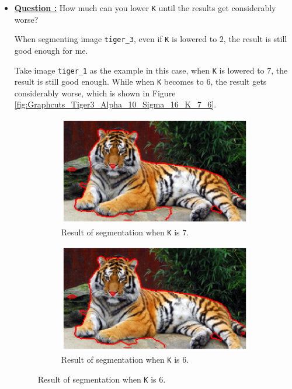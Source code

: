 \documentclass[11pt,a4paper]{article}
\begin{document}
\begin{itemize}
	\item\addtocounter{Counter}{1}\underline{\textbf{Question :}} How much can you lower \texttt{K} until the results get considerably worse?
		\par When segmenting image \texttt{tiger\_3}, even if \texttt{K} is lowered to $2$, the result is still good enough for me.
		\par Take image \texttt{tiger\_1} as the example in this case, when \texttt{K} is lowered to $7$, the result is still good enough. While when \texttt{K} becomes to $6$, the result gets considerably worse, which is shown in Figure \ref{fig:Graphcuts_Tiger3_Alpha_10_Sigma_16_K_7_6}.
		\begin{figure}[!ht]
			\footnotesize
			\centering 
			\begin{subfigure}[t]{0.49\linewidth} %
			\includegraphics[width=\columnwidth]{Graphcuts_Tiger1_Alpha_8_Sigma_16_K_7.eps}
			\caption{Result of segmentation when \texttt{K} is $7$.}
			\label{fig:Graphcuts_Tiger1_Alpha_8_Sigma_16_K_7}
			\end{subfigure}
			\begin{subfigure}[t]{0.49\linewidth} %
			\includegraphics[width=\columnwidth]{Graphcuts_Tiger1_Alpha_8_Sigma_16_K_6.eps}
			\caption{Result of segmentation when \texttt{K} is $6$.}
			\label{fig:Graphcuts_Tiger1_Alpha_8_Sigma_16_K_6}
			\end{subfigure}
			

\end{figure}
\end{itemize}
\end{document}

